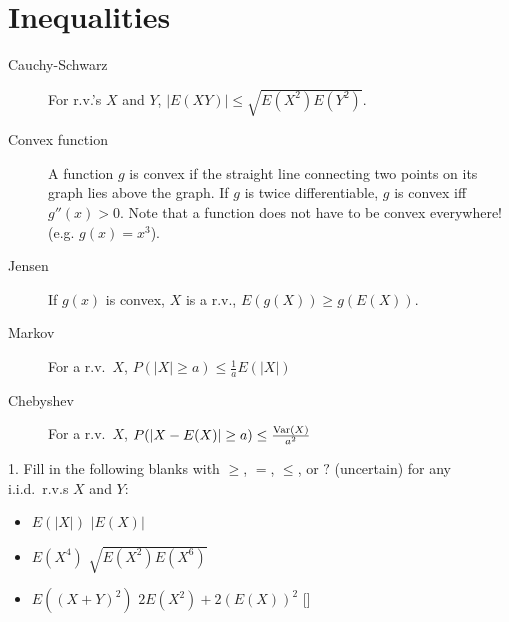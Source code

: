 \documentclass{article}
\begin{document}
 

\header

\section{Inequalities}

\begin{description}
\item[Cauchy-Schwarz] For r.v.'s $X$ and $Y$, $|E(XY)| \leq \sqrt{E(X^2)E(Y^2)}$. 

\item[Convex function] A function $g$ is convex if the straight line connecting two points on its graph lies above the graph. If $g$ is twice differentiable, $g$ is convex iff $g''(x) > 0$. Note that a function does not have to be convex everywhere! (e.g. $g(x) = x^3$). 

\item[Jensen] If $g(x)$ is convex, $X$ is a r.v., $E(g(X)) \geq g(E(X))$. 

\item[Markov] For a r.v.~$X$, $P(|X| \geq a) \leq \frac{1}{a}E(|X|)$  

\item[Chebyshev] For a r.v.~$X$, $P(|X-E(X)| \geq a) \leq \frac{\textrm{Var}(X)}{a^2}$ 

\end{description}
1. Fill in the following blanks with $\geq$, $=$, $\leq$, or $?$ (uncertain) for any i.i.d.~r.v.s $X$ and $Y$:
\begin{itemize}
\item $E(|X|)$ \underline{\hspace{1cm}} $|E(X)|$


\item $E(X^4)$ \underline{\hspace{1cm}} $\sqrt{E(X^2)E(X^6)}$


\item $E((X+Y)^2)$ \underline{\hspace{1cm}} $2E(X^2) + 2(E(X))^2$ []


\end{itemize}
\end{document}

